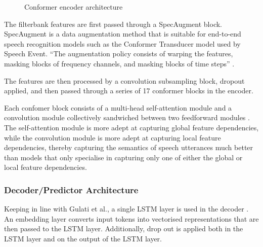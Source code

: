 \documentclass{CSSRforAfrica}
\begin{document}
\begin{figure}[thb]
\begin{center}
\end{center}
\caption{Conformer encoder architecture \cite{gulati_conformer_2020}}
\label{fig:conformer-encoder}
\end{figure}

The filterbank features are first passed through a SpecAugment block. SpecAugment is a data augmentation method that is suitable for end-to-end speech recognition models such as the Conformer Transducer model used by Speech Event. ``The augmentation policy consists of warping the features, masking blocks of frequency channels, and masking blocks of time steps'' \cite{park_specaugment_2019}.

The features are then processed by a convolution subsampling block, dropout applied, and then passed through a series of 17 conformer blocks in the encoder.

Each confomer block consists of a multi-head self-attention module and a convolution module collectively sandwiched between two feedforward modules \cite{gulati_conformer_2020}. The self-attention module is more adept at capturing global feature dependencies, while the convolution module is more adept at capturing local feature dependencies, thereby capturing the semantics of speech utterances much better than models that only specialise in capturing only one of either the global or local feature dependencies.

\subsubsection{Decoder/Predictor Architecture}
Keeping in line with Gulati et al., a single LSTM layer is used in the decoder \cite{gulati_conformer_2020}. An embedding layer converts input tokens into vectorised representations that are then passed to the LSTM layer. Additionally, drop out is applied both in the LSTM layer and on the output of the LSTM layer.
\end{document}
